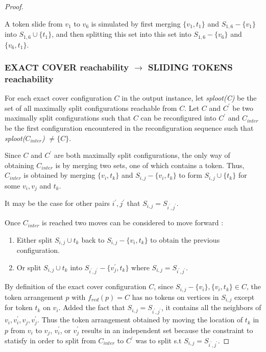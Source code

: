 \begin{proof}
\begin{example}A token slide from $v_1$ to $v_6$ is simulated by first merging $\{v_1, t_1\}$ and $S_{1,6} - \{v_1\}$ into $S_{1,6} \cup \{t_1\}$,
and then splitting this set into this set into $S_{1,6} - \{v_6\}$ and $\{v_6, t_1\}$.
\end{example}

\subsubsection{EXACT COVER reachability $\rightarrow$ SLIDING TOKENS reachability}\label{subsubsection:backward}

For each exact cover configuration $C$ in the output instance, let \textit{sploot(C)} be the set of all maximally split configurations reachable
from $C$. Let $C$ and $C^{'}$ be two maximally split configurations such that $C$ can be reconfigured into $C^{'}$ and $C_{inter}$ be the first
configuration encountered in the reconfiguration sequence such that \textit{sploot($C_{inter}$)} $\neq \{C\}$.

\begin{obs}
Since $C$ and $C^{'}$ are both maximally split configurations, the only way of obtaining $C_{inter}$ is by merging two sets, one of which contains
a token. Thus, $C_{inter}$ is obtained by merging $\{v_i, t_k\}$ and $S_{i,j} - \{v_i, t_k\}$  to form $S_{i,j} \cup \{t_k\}$ for
some $v_i, v_j$ and $t_k$.
\end{obs}

\begin{remark}
It may be the case for other pairs $i^{'}, j^{'}$ that $S_{i,j} = S_{i^{'}, j^{'}}$.
\end{remark}

Once $C_{inter}$ is reached two moves can be considered to move forward :
\begin{enumerate}
  \item Either split $S_{i,j} \cup t_k$ back to $S_{i,j} - \{v_i,t_k\}$ to obtain the previous configuration.
  \item Or split $S_{i,j} \cup t_k$ into $S_{i^{'},j^{'}} - \{v_j^{'},t_k\}$ where $S_{i,j} = S_{i^{'}, j^{'}}$.
\end{enumerate}

By definition of the exact cover configuration $C$, since $S_{i,j} - \{v_i\}, \{v_i, t_k\} \in C$, the token
arrangement $p$ with $f_{red}(p) = C$ has no tokens on vertices in $S_{i,j}$ except for token $t_k$ on $v_i$. Added the fact
that $S_{i,j} = S_{i^{'}, j^{'}}$, it contains all the neighbors of $v_i, v_i^{'}, v_j, v_j^{'}$. Thus the token
arrangement obtained by moving the location of $t_k$ in $p$ from $v_i$ to $v_j$, $v_i^{'}$, or $v_j^{'}$ results in an independent set because
the constraint to statisfy in order to split from $C_{inter}$ to $C^{'}$ was to split s.t $S_{i,j} = S_{i^{'}, j^{'}}$.


\end{proof}
